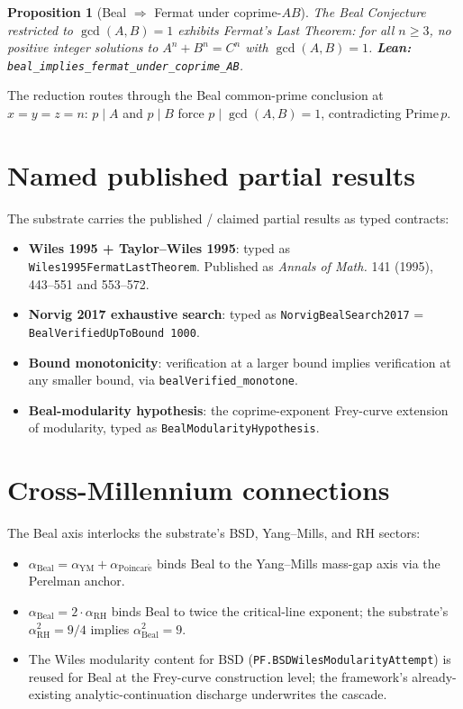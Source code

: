 \documentclass[11pt,a4paper]{article}
\theoremstyle{plain}
\newtheorem{proposition}[theorem]{Proposition}
\theoremstyle{definition}
\begin{document}
\begin{proposition}[Beal $\Rightarrow$ Fermat under coprime-$AB$]
\label{prop:beal-implies-fermat}
The Beal Conjecture restricted to $\gcd(A,B) = 1$ exhibits Fermat's
Last Theorem: for all $n \ge 3$, no positive integer solutions to
$A^{n} + B^{n} = C^{n}$ with $\gcd(A,B) = 1$.
\textbf{Lean:}
\texttt{beal\_implies\_fermat\_under\_coprime\_AB}.
\end{proposition}

The reduction routes through the Beal common-prime conclusion at
$x = y = z = n$: $p \mid A$ and $p \mid B$ force
$p \mid \gcd(A,B) = 1$, contradicting $\mathrm{Prime}\, p$.

\section{Named published partial results}

The substrate carries the published / claimed partial results as
typed contracts:

\begin{itemize}[leftmargin=*]
\item \textbf{Wiles 1995 + Taylor--Wiles 1995}: typed as
\texttt{Wiles1995FermatLastTheorem}. Published as
\emph{Annals of Math.} 141 (1995), 443--551 and 553--572.
\item \textbf{Norvig 2017 exhaustive search}: typed as
\texttt{NorvigBealSearch2017} = \texttt{BealVerifiedUpToBound 1000}.
\item \textbf{Bound monotonicity}: verification at a larger bound
implies verification at any smaller bound, via
\texttt{bealVerified\_monotone}.
\item \textbf{Beal-modularity hypothesis}: the coprime-exponent
Frey-curve extension of modularity, typed as
\texttt{BealModularityHypothesis}.
\end{itemize}

\section{Cross-Millennium connections}

The Beal axis interlocks the substrate's BSD, Yang--Mills, and RH
sectors:
\begin{itemize}[leftmargin=*,nosep]
\item $\alpha_{\mathrm{Beal}} = \alpha_{\mathrm{YM}}
+ \alpha_{\mathrm{Poincar\acute e}}$ binds Beal to the Yang--Mills
mass-gap axis via the Perelman anchor.
\item $\alpha_{\mathrm{Beal}} = 2 \cdot \alpha_{\mathrm{RH}}$ binds
Beal to twice the critical-line exponent; the substrate's
$\alpha_{\mathrm{RH}}^{2} = 9/4$ implies
$\alpha_{\mathrm{Beal}}^{2} = 9$.
\item The Wiles modularity content for $\mathrm{BSD}$
(\texttt{PF.BSDWilesModularityAttempt}) is reused for Beal at the
Frey-curve construction level; the framework's already-existing
analytic-continuation discharge underwrites the cascade.
\end{itemize}
\end{document}
